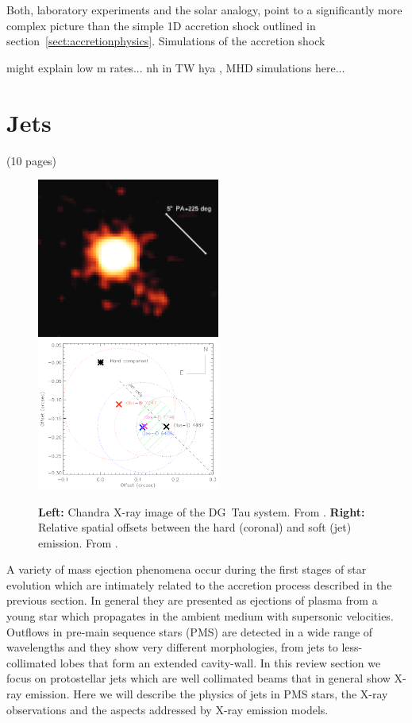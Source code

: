 \documentclass[graybox, nosecnum]{svmult}
\begin{document}
Both, laboratory experiments and the solar analogy, point to a significantly more complex picture than the simple 1D accretion shock outlined in section~\ref{sect:accretionphysics}. Simulations of the accretion shock 


might explain low m rates... nh in TW hya , MHD simulations here...

\section{Jets}
 {\color{blue}        (10 pages)}
 
 

\begin{figure}[t]

\includegraphics[width=6cm]{figs/dg_tau_X}
\includegraphics[width=6cm]{figs/dg_tau_offsets}

\caption{{\bf Left: } Chandra X-ray image of the DG~Tau system. From \citet{2011ASPC..448..617G}.
         {\bf Right: } Relative spatial offsets between the hard (coronal) and soft (jet) emission. From \citet{Schneider_2008}. \label{fig:dg_tau_X}}
\end{figure}

 
 A variety of mass ejection phenomena occur during the first stages of star evolution which are intimately related to the accretion process described in the previous section. In general they are presented as ejections of plasma from a young star which propagates in the ambient medium with supersonic velocities. Outflows in pre-main sequence stars (PMS) are detected in a wide range of wavelengths and they show very different morphologies, from jets to less-collimated lobes that form an extended cavity-wall. In this review section we focus on protostellar jets which are well collimated beams that in general show X-ray emission. Here we will describe the physics of jets in PMS stars, the X-ray observations and the aspects addressed by X-ray emission models.
 
\end{document}
